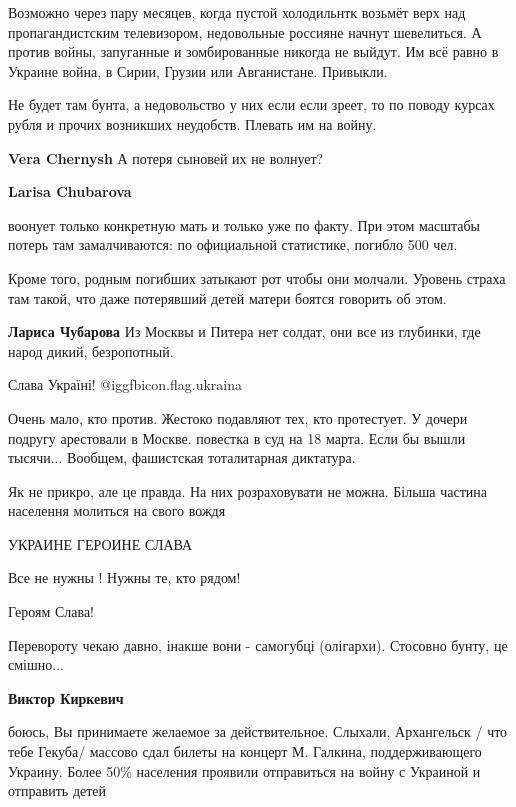 \begin{itemize}

Возможно через пару месяцев, когда пустой холодильнтк возьмёт верх над
пропагандистским телевизором, недовольные россияне начнут шевелиться. А против
войны, запуганные и зомбированные никогда не выйдут. Им всё равно в Украине
война, в Сирии, Грузии или Авганистане. Привыкли.


Не будет там бунта, а недовольство у них если если зреет, то по поводу курсах
рубля и прочих возникших неудобств. Плевать им на войну.

\begin{itemize} %
\textbf{Vera Chernysh} А потеря сыновей их не волнует?

\textbf{Larisa Chubarova} 

воонует только конкретную мать и только уже по факту. При этом масштабы потерь
там замалчиваются: по официальной статистике, погибло 500 чел.

Кроме того, родным погибших затыкают рот чтобы они молчали. Уровень страха там
такой, что даже потерявший детей матери боятся говорить об этом.

\textbf{Лариса Чубарова} Из Москвы и Питера нет солдат, они все из глубинки, где народ дикий, безропотный.
\end{itemize} %

Слава Україні! @igg{fbicon.flag.ukraina}


Очень мало, кто против. Жестоко подавляют тех, кто протестует. У дочери подругу
арестовали в Москве. повестка в суд на 18 марта. Если бы вышли тысячи...
Вообщем, фашистская тоталитарная диктатура.


Як не прикро, але це правда. На них розраховувати не можна. Більша частина населення молиться на свого вождя

УКРАИНЕ ГЕРОИНЕ СЛАВА

Все не нужны ! Нужны те, кто рядом!

Героям Слава!

Перевороту чекаю давно, інакше вони - самогубці (олігархи). Стосовно бунту, це смішно...

\textbf{Виктор Киркевич} 

боюсь, Вы принимаете желаемое за действительное. Слыхали, Архангельск / что
тебе Гекуба/ массово сдал билеты на концерт М. Галкина, поддерживающего
Украину. Более 50\% населения проявили отправиться на войну с Украиной и
отправить детей


\end{itemize}
